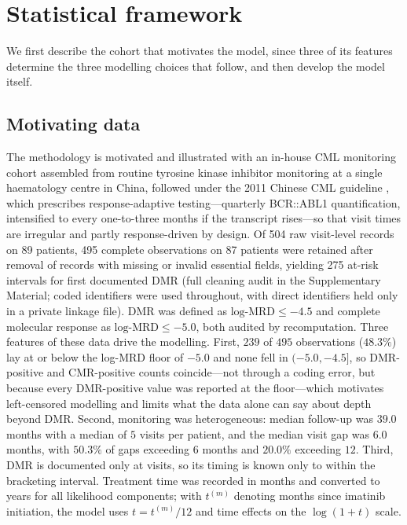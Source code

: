 \documentclass[11pt]{article}
\begin{document}
\section{Statistical framework}
\label{sec:methods}

We first describe the cohort that motivates the model, since three of its
features determine the three modelling choices that follow, and then develop the
model itself.

\subsection{Motivating data}
\label{sec:motivating}

The methodology is motivated and illustrated with an in-house CML monitoring
cohort assembled from routine tyrosine kinase inhibitor monitoring at a single
haematology centre in China, followed under the 2011 Chinese CML guideline
\cite{CSH2011CMLGuideline}, which prescribes response-adaptive testing---quarterly
BCR::ABL1 quantification, intensified to every one-to-three months if the
transcript rises---so that visit times are irregular and partly response-driven
by design. Of 504 raw visit-level records on 89 patients, 495 complete
observations on 87 patients were retained after removal of records with missing
or invalid essential fields, yielding 275 at-risk intervals for first documented
DMR (full cleaning audit in the Supplementary Material; coded identifiers were
used throughout, with direct identifiers held only in a private linkage file).
DMR was defined as $\text{log-MRD}\le-4.5$ and complete molecular response as
$\text{log-MRD}\le-5.0$, both audited by recomputation. Three features of these
data drive the modelling. First, $239$ of $495$ observations ($48.3\%$) lay at
or below the log-MRD floor of $-5.0$ and none fell in $(-5.0,-4.5]$, so
DMR-positive and CMR-positive counts coincide---not through a coding error, but
because every DMR-positive value was reported at the floor---which motivates
left-censored modelling and limits what the data alone can say about depth
beyond DMR. Second, monitoring was heterogeneous: median follow-up was $39.0$
months with a median of $5$ visits per patient, and the median visit gap was
$6.0$ months, with $50.3\%$ of gaps exceeding $6$ months and $20.0\%$ exceeding
$12$. Third, DMR is documented only at visits, so its timing is known only to
within the bracketing interval. Treatment time was recorded in months and
converted to years for all likelihood components; with $t^{(m)}$ denoting months
since imatinib initiation, the model uses $t=t^{(m)}/12$ and time effects on the
$\log(1+t)$ scale.
\end{document}
